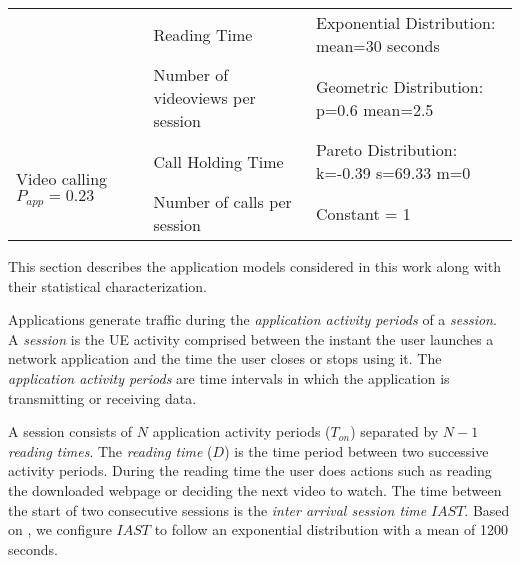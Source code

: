 \documentclass[conference]{IEEEtran}
\begin{document}
\begin{table*}[tb]
{\begin{tabularx}{\textwidth}{l|l|X}
                                        & Reading Time                    & Exponential Distribution: mean=30 seconds                                                                                                                                                                        \\ \cline{2-3}
                                        & Number of videoviews per session    & Geometric Distribution: p=0.6 mean=2.5                                                                                                                                                                          \\ \cline{2-3}
\hline
\multirow{2}{*}{\parbox[t]{1.9cm}{\centering Video calling $P_{app}=0.23$}}          & Call Holding Time                   & Pareto Distribution: k=-0.39 s=69.33 m=0                                                                                                                                                                        \\ \cline{2-3}
                                        & Number of calls per session         & Constant = 1
\\ \cline{2-3}                                       
\hline \hline                                                  
\end{tabularx}
}
\end{table*}


This section describes the application models considered in this work along with their statistical characterization. 

Applications generate traffic during the \emph{application activity periods} of a \emph{session}. A \emph{session} is the UE activity comprised between the instant the user launches a network application and the time the user closes or stops using it. The \emph{application activity periods} are time intervals in which the application is transmitting or receiving data. 

A session consists of $N$ application activity periods ($T_{on}$) separated by $N-1$ \emph{reading times}. The \emph{reading time} ($D$) is the time period between two successive activity periods. During the reading time the user does actions such as reading the downloaded webpage or deciding the next video to watch. The time between the start of two consecutive sessions is the \emph{inter arrival session time} $IAST$. Based on \cite{Ilias14}, we configure $IAST$ to follow an exponential distribution with a mean of 1200 seconds.
\end{document}
